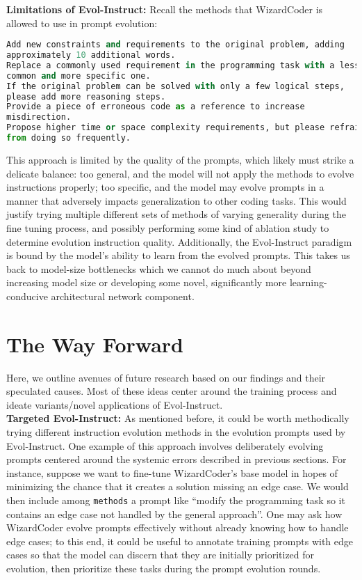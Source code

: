 \documentclass[10pt]{article}
\newcommand{\code}[1]{\texttt{#1}}
\theoremstyle{definition}
\begin{document}
\noindent\textbf{Limitations of Evol-Instruct:} Recall the methods that WizardCoder is allowed to use in prompt evolution:
\begin{lstlisting}[language=Python]
Add new constraints and requirements to the original problem, adding
approximately 10 additional words.
Replace a commonly used requirement in the programming task with a less
common and more specific one.
If the original problem can be solved with only a few logical steps,
please add more reasoning steps.
Provide a piece of erroneous code as a reference to increase
misdirection.
Propose higher time or space complexity requirements, but please refrain
from doing so frequently.
\end{lstlisting}
\noindent This approach is limited by the quality of the prompts, which likely must strike a delicate balance: too general, and the model will not apply the methods to evolve instructions properly; too specific, and the model may evolve prompts in a manner that adversely impacts generalization to other coding tasks. This would justify trying multiple different sets of methods of varying generality during the fine tuning process, and possibly performing some kind of ablation study to determine evolution instruction quality. Additionally, the Evol-Instruct paradigm is bound by the model's ability to learn from the evolved prompts. This takes us back to model-size bottlenecks which we cannot do much about beyond increasing model size or developing some novel, significantly more learning-conducive architectural network component.

\section{The Way Forward}
\noindent Here, we outline avenues of future research based on our findings and their speculated causes. Most of these ideas center around the training process and ideate variants/novel applications of Evol-Instruct.\\

\noindent\textbf{Targeted Evol-Instruct:} As mentioned before, it could be worth methodically trying different instruction evolution methods in the evolution prompts used by Evol-Instruct. One example of this approach involves deliberately evolving prompts centered around the systemic errors described in previous sections. For instance, suppose we want to fine-tune WizardCoder's base model in hopes of minimizing the chance that it creates a solution missing an edge case. We would then include among \code{methods} a prompt like ``modify the programming task so it contains an edge case not handled by the general approach''. One may ask how WizardCoder evolve prompts effectively without already knowing how to handle edge cases; to this end, it could be useful to annotate training prompts with edge cases so that the model can discern that they are initially prioritized for evolution, then prioritize these tasks during the prompt evolution rounds.\\
\end{document}
